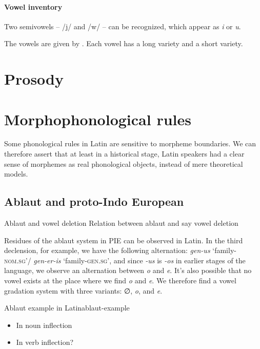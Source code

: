 \documentclass[a4paper, oneside, 12pt]{report}
\newcommand*{\citetable}[1]{Table~{#1}}
\newcommand{\form}[1]{\emph{#1}}
\newcommand*{\category}[1]{\textsc{#1}}
\newcommand{\translate}[1]{`#1'}
\begin{document}
\paragraph*{Vowel inventory}
Two semivowels -- /j/ and /w/ -- can be recognized,
which appear as \form{i} or \form{u}.

The vowels are given by \citet[\citetable{3.2}]{oniga2014latin}.
Each vowel has a long variety and a short variety.

\section{Prosody}



\section{Morphophonological rules}\label{sec:phonology.morphological}

Some phonological rules in Latin are sensitive to morpheme boundaries.
We can therefore assert that at least in a historical stage, 
Latin speakers had a clear sense of morphemes 
as real phonological objects,
instead of mere theoretical models.

\subsection{Ablaut and proto-Indo European}

\begin{todobox}{Ablaut and vowel deletion}
    Relation between ablaut and say vowel deletion
\end{todobox}

Residues of the ablaut system in PIE can be observed in Latin.
In the third declension, for example,
we have the following alternation:
\form{gen-us} \translate{family-\category{nom.sg}}/
\form{gen-er-is} \translate{family-\category{gen.sg}},
and since \form{-us} is \form{-os} in earlier stages of the language,
we observe an alternation between \form{o} and \form{e}.
It's also possible that no vowel exists at the place where we find \form{o} and \form{e}.
We therefore find a vowel gradation system with three variants:
∅, \form{o}, and \form{e}.

\begin{todobox}{Ablaut example in Latin}{ablaut-example}
    \begin{itemize}
        \item In noun inflection
        \item In verb inflection?
    \end{itemize}
\end{todobox}
\end{document}
